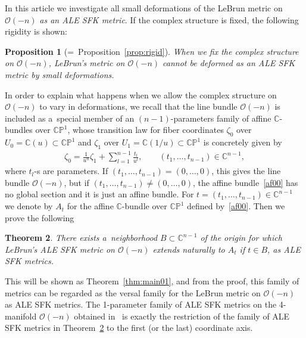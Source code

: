 \documentclass[pdftex]{sigma}
\numberwithin{equation}{section}
\newtheorem{Theorem}{Theorem}[section]
\newtheorem{Proposition}[Theorem]{Proposition}
{\theoremstyle{definition}
\newtheorem{Definition}[Theorem]{Definition}
\newtheorem{Remark}[Theorem]{Remark}
}
\begin{document}
In this article we investigate all small deformations of the LeBrun metric on $\mathscr O(-n)$ {\textit{as an ALE SFK metric}}.
If the complex structure is f\/ixed, the following rigidity is shown:
\begin{Proposition}[=~Proposition~\ref{prop:rigid}]
\label{prop:rigid0}
When we fix the complex structure on $\mathscr O(-n)$, LeBrun's metric on $\mathscr O(-n) $ cannot be deformed as an
ALE SFK metric by small deformations.
\end{Proposition}

In order to explain what happens when we allow the complex structure on $\mathscr O(-n)$ to vary in deformations, we
recall that the line bundle $\mathscr O(-n)$ is included as a~special member of an $(n-1)$-parameters family of
af\/f\/ine $\mathbb{C}$-bundles over $\mathbb{CP}^1$, whose transition law for f\/iber coordinates $\zeta_0$ over
$U_0=\mathbb{C}(u)\subset\mathbb{CP}^1$ and $\zeta_1$ over $U_1=\mathbb{C}(1/u)\subset\mathbb{CP}^1$ is concretely given
by
\begin{gather}
\label{af00}
\zeta_0 = \frac 1{u^n} \zeta_1 + \sum\limits_{l=1}^{n-1} \frac {t_l} {u^l},
\qquad
(t_1,\dots,t_{n-1})\in \mathbb{C}^{n-1},
\end{gather}
where $t_l$-s are parameters.
If $(t_1,\dots,t_{n-1})=(0,\dots,0)$, this gives the line bundle $\mathscr O(-n)$,
but if $(t_1,\dots,t_{n-1})\neq(0,\dots,0)$, the af\/f\/ine bundle~\eqref{af00} has no global section and it is just an af\/f\/ine bundle.
For $t=(t_1,\dots,t_{n-1})\in\mathbb{C}^{n-1}$ we denote by $A_t$ for the af\/f\/ine $\mathbb{C}$-bundle over
$\mathbb{CP}^1$ def\/ined by~\eqref{af00}.
Then we prove the following

\begin{Theorem}
\label{thm:0}
There exists a~neighborhood $B\subset\mathbb{C}^{n-1}$ of the origin for which LeBrun's ALE SFK metric on $\mathscr
O(-n)$ extends naturally to $A_t$ if $t\in B$, as ALE SFK metrics.
\end{Theorem}

This will be shown as Theorem~\ref{thm:main01}, and from the proof, this family of metrics can be regarded as the versal
family for the LeBrun metric on $\mathscr O(-n)$ as ALE SFK metrics.
The 1-parameter family of ALE SFK metrics on the 4-manifold $\mathscr O(-n)$ obtained in~\cite{HonCMP2} is exactly the
restriction of the family of ALE SFK metrics in Theorem~\ref{thm:0} to the f\/irst (or the last) coordinate axis.
\end{document}
